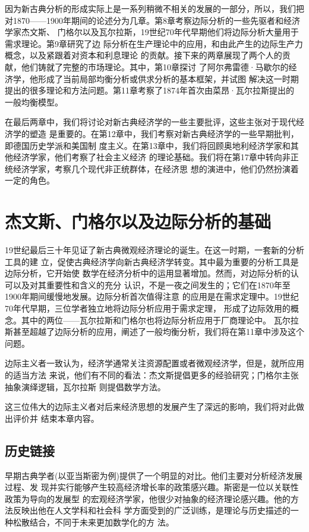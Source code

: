 因为新古典分析的形成实际上是一系列稍微不相关的发展的一部分，所以，我们把
对1870——1900年期间的论述分为几章。第8章考察边际分析的一些先驱者和经济学家杰文斯、
门格尔以及瓦尔拉斯，19世纪70年代早期他们将边际分析大量用于需求理论。第9章研究了边
际分析在生产理论中的应用，和由此产生的边际生产力概念，以及紧跟着对资本和利息理论
的贡献。接下来的两章展现了两个人的贡献，他们铸就了完整的市场理论。其中，第10章探讨
了阿尔弗雷德·马歇尔的经济学，他形成了当前局部均衡分析或供求分析的基本框架，并试图
解决这一时期提出的很多理论和方法问题。第11章考察了1874年首次由菜昂·瓦尔拉斯提出的
一般均衡模型。

在最后两章中，我们将讨论对新古典经济学的一些主要批评，这些主张对于现代经济学的塑造
是重要的。在第12章中，我们考察对新古典经济学的一些早期批判，即德国历史学派和美国制
度主义。在第13章中，我们将回顾奥地利经济学家和其他经济学家，他们考察了社会主义经济
的理论基础。我们将在第17章中转向非正统经济学家，考察几个现代非正统群体，在经济思
想的演进中，他们仍然扮演着一定的角色。

\chapter{杰文斯、门格尔以及边际分析的基础}

19世纪最后三十年见证了新古典微观经济理论的诞生。在这一时期，一套新的分析工具的建
立，促使古典经济学向新古典经济学转变。其中最为重要的分析工具是边际分析，它开始使
数学在经济分析中的运用显著增加。然而，对边际分析的认可以及对其重要性和含义的充分
认识，不是一夜之间发生的；它们在1870年至1900年期间缓慢地发展。边际分析首次值得注意
的应用是在需求定理中。19世纪70年代早期，三位学者独立地将边际分析应用于需求定理，
形成了边际效用的概念。其中的两位——瓦尔拉斯和门格尔也将边际分析应用于厂商理论中。
瓦尔拉斯甚至超越了边际分析的应用，阐述了一般均衡分析，我们将在第11章中涉及这个问题。

边际主义者一致认为，经济学通常关注资源配置或者微观经济学，但是，就所应用的适当方法
来说，他们有不同的看法：杰文斯提倡更多的经验研究；门格尔主张抽象演绎逻辑，瓦尔拉斯
则提倡数学方法。

这三位伟大的边际主义者对后来经济思想的发展产生了深远的影响，我们将对此做出评价并
结束本章内容。

\section{历史链接}

早期古典学者(以亚当斯密为例)提供了一个明显的对比。他们主要对分析经济发展过程、发
现并实行能够产生较高经济增长率的政策感兴趣。斯密是一位以关联性政策为导向的发展型
的宏观经济学家，他很少对抽象的经济理论感兴趣。他的方法反映出他在人文学科和社会科
学方面受到的广泛训练，是理论与历史描述的一种松散结合，不同于未来更加数学化的方
法。

